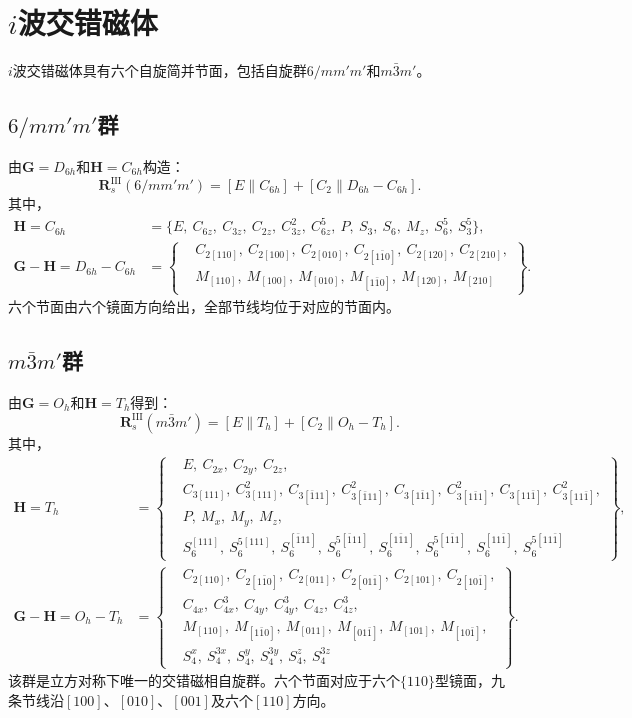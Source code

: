 \section{$i$波交错磁体}\label{sec:i-wave}

$i$波交错磁体具有六个自旋简并节面，包括自旋群$6/mm'm'$和$m\bar{3}m'$。

\subsection*{$6/mm'm'$群}
由$\mathbf{G}=D_{6h}$和$\mathbf{H}=C_{6h}$构造：
\[
\mathbf{R}_s^{\mathrm{III}}(6/mm'm') = [E\|C_{6h}] + [C_2\|D_{6h}-C_{6h}].
\]
其中，
\[
\begin{aligned}
\mathbf{H}=C_{6h} &= \{E,\ C_{6z},\ C_{3z},\ C_{2z},\ C_{3z}^2,\ C_{6z}^5,\ P,\ S_3,\ S_6,\ M_z,\ S_6^5,\ S_3^5\},\\
\mathbf{G}-\mathbf{H}=D_{6h}-C_{6h} &= \left\{
\begin{aligned}
&C_{2[110]},\ C_{2[100]},\ C_{2[010]},\ C_{2[1\bar10]},\ C_{2[120]},\ C_{2[210]},\\
&M_{[110]},\ M_{[100]},\ M_{[010]},\ M_{[1\bar10]},\ M_{[120]},\ M_{[210]}
\end{aligned}
\right\}.
\end{aligned}
\]
六个节面由六个镜面方向给出，全部节线均位于对应的节面内。

\subsection*{$m\bar{3}m'$群}
由$\mathbf{G}=O_h$和$\mathbf{H}=T_h$得到：
\[
\mathbf{R}_s^{\mathrm{III}}(m\bar{3}m') = [E\|T_h] + [C_2\|O_h-T_h].
\]
其中，
\[
\begin{aligned}
\mathbf{H}=T_h &= \left\{
\begin{aligned}
&E,\ C_{2x},\ C_{2y},\ C_{2z},\\
&C_{3[111]},\ C_{3[111]}^2,\ C_{3[\bar111]},\ C_{3[\bar111]}^2,\ C_{3[1\bar11]},\ C_{3[1\bar11]}^2,\ C_{3[11\bar1]},\ C_{3[11\bar1]}^2,\\
&P,\ M_x,\ M_y,\ M_z,\\
&S_6^{[111]},\ S_6^{5[111]},\ S_6^{[\bar111]},\ S_6^{5[\bar111]},\ S_6^{[1\bar11]},\ S_6^{5[1\bar11]},\ S_6^{[11\bar1]},\ S_6^{5[11\bar1]}
\end{aligned}
\right\},\\
\mathbf{G}-\mathbf{H}=O_h-T_h &= \left\{
\begin{aligned}
&C_{2[110]},\ C_{2[1\bar10]},\ C_{2[011]},\ C_{2[01\bar1]},\ C_{2[101]},\ C_{2[10\bar1]},\\
&C_{4x},\ C_{4x}^3,\ C_{4y},\ C_{4y}^3,\ C_{4z},\ C_{4z}^3,\\
&M_{[110]},\ M_{[1\bar10]},\ M_{[011]},\ M_{[01\bar1]},\ M_{[101]},\ M_{[10\bar1]},\\
&S_4^x,\ S_4^{3x},\ S_4^y,\ S_4^{3y},\ S_4^z,\ S_4^{3z}
\end{aligned}
\right\}.
\end{aligned}
\]
该群是立方对称下唯一的交错磁相自旋群。六个节面对应于六个$\{110\}$型镜面，九条节线沿$[100]$、$[010]$、$[001]$及六个$[110]$方向。

